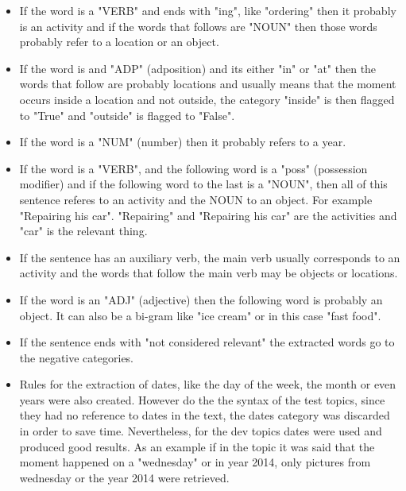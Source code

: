   \begin{itemize}
    
      \item  If the word is a "VERB" and ends with "ing", like "ordering" then it probably is an activity and if the words that follows are "NOUN" then those words probably refer to a location or an object. 
      
      
      \item  If the word is and "ADP" (adposition) and its either "in" or "at" then the words that follow are probably locations and usually means that the moment occurs inside a location and not outside, the category "inside" is then flagged to "True" and "outside" is flagged to "False".
      
      \item If the word is a "NUM" (number) then it probably refers to a year.
      
      \item If the word is a "VERB", and the following word is a "poss" (possession modifier) and if the following word to the last is a "NOUN", then all of this sentence referes to an activity and the NOUN to an object. For example "Repairing his car". "Repairing" and "Repairing his car" are the activities and "car" is the relevant thing.
      
      \item If the sentence has an auxiliary verb, the main verb usually corresponds to an activity and the words that follow the main verb may be objects or locations.
      
      \item If the word is an "ADJ" (adjective) then the following word is probably an object. It can also be a bi-gram like "ice cream" or in this case "fast food".
      
      \item If the sentence ends with "not considered relevant" the extracted words go to the negative categories.
      
      \item Rules for the extraction of dates, like the day of the week, the month or even years were also created. However do the the syntax of the test topics, since they had no reference to dates in the text, the dates category was discarded in order to save time. Nevertheless, for the dev topics dates were used and produced good results. As an example if in the topic it was said that the moment happened on a "wednesday" or in year 2014, only pictures from wednesday or the year 2014 were retrieved.

    \end{itemize}
      
